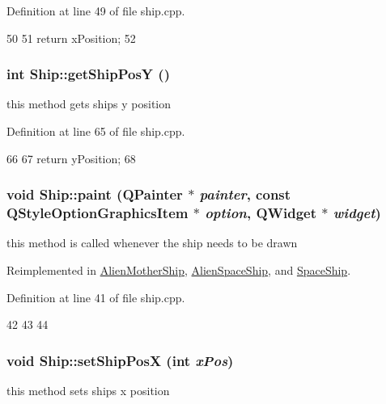 Definition at line 49 of file ship.cpp.


\begin{DoxyCode}
50 {
51     return xPosition;
52 }
\end{DoxyCode}
\hypertarget{class_ship_a554008262afb114d9360a8d80fd9c2c9}{
\subsubsection[{getShipPosY}]{\setlength{\rightskip}{0pt plus 5cm}int Ship::getShipPosY ()}}
\label{class_ship_a554008262afb114d9360a8d80fd9c2c9}
this method gets ships y position 

Definition at line 65 of file ship.cpp.


\begin{DoxyCode}
66 {
67     return yPosition;
68 }
\end{DoxyCode}
\hypertarget{class_ship_a1dad980a3b84bb77c63da853ec13477d}{
\subsubsection[{paint}]{\setlength{\rightskip}{0pt plus 5cm}void Ship::paint (QPainter $\ast$ {\em painter}, \/  const QStyleOptionGraphicsItem $\ast$ {\em option}, \/  QWidget $\ast$ {\em widget})}}
\label{class_ship_a1dad980a3b84bb77c63da853ec13477d}
this method is called whenever the ship needs to be drawn 

Reimplemented in \hyperlink{class_alien_mother_ship_a9d504befceb130b6c833550f6f6a0b53}{AlienMotherShip}, \hyperlink{class_alien_space_ship_a463eea8a3dfe340539766da746e168b5}{AlienSpaceShip}, and \hyperlink{class_space_ship_adfc89b9201d546c24ca0bd7b59b44d24}{SpaceShip}.

Definition at line 41 of file ship.cpp.


\begin{DoxyCode}
42 {
43 
44 }
\end{DoxyCode}
\hypertarget{class_ship_a04c11ab00c916c3a1b32f5ad468f867b}{
\subsubsection[{setShipPosX}]{\setlength{\rightskip}{0pt plus 5cm}void Ship::setShipPosX (int {\em xPos})}}
\label{class_ship_a04c11ab00c916c3a1b32f5ad468f867b}
this method sets ships x position 

